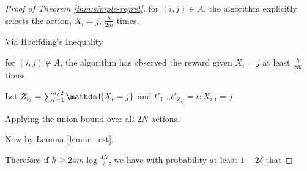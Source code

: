 \begin{proof}[Proof of Theorem \ref{thm:simple-regret}]


for $(i,j)\in A$, the algorithm explicitly selects the action, $X_i = j$,  $\frac{h}{2\hat m}$ times.

Via Hoeffding's Inequality


for $(i,j)\notin A$, the algorithm has observed the reward given $X_i = j$ at least $\frac{h}{2\hat m}$ times.


Let  $Z_{ij} = \sum_{t=1}^{h/2} \ind{X_i = j}$ and $t'_1 ... t'_{Z_{ij}} = {t:X_{i,t} = j}$




Applying the union bound over all $2N$ actions.

Now by Lemma \ref{lem:m_est}, 

Therefore if $h \geq 24m \log \frac{4N}{\delta}$, we have with probability at least $1 - 2\delta$ that


\end{proof}
